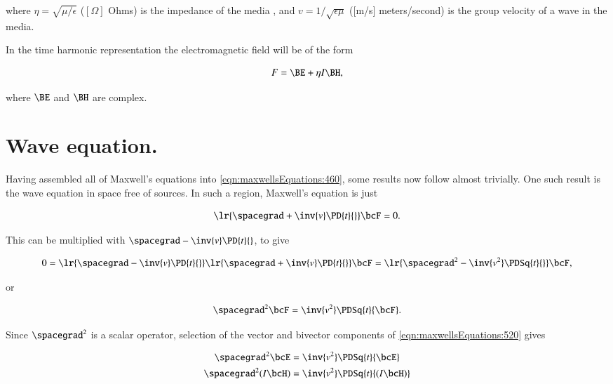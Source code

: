 where \( \eta = \sqrt{\mu/\epsilon} \) (\( [\Omega] \) Ohms)
is the impedance of the media
, and \( v = 1/\sqrt{\epsilon\mu} \)
([\si{m/s}] meters/second)
is the group velocity of a wave in the media.

In the time harmonic representation the electromagnetic field will be of the form

\begin{dmath}\label{eqn:maxwellsEquations:620}
F = \BE + \eta I \BH,
\end{dmath}

where \( \BE \) and \( \BH \) are complex.

\makedigression{

}

\section{Wave equation.}

Having assembled all of Maxwell's equations into \cref{eqn:maxwellsEquations:460}, some results now follow almost trivially.  One such result is the wave equation in space free of sources.  In such a region, Maxwell's equation is just

\begin{dmath}\label{eqn:maxwellsEquations:480}
\lr{ \spacegrad + \inv{v} \PD{t}{} } \bcF = 0.
\end{dmath}

This can be multiplied with \( \spacegrad - \inv{v} \PD{t}{} \), to give

\begin{dmath}\label{eqn:maxwellsEquations:500}
0 =
\lr{ \spacegrad - \inv{v} \PD{t}{} }
\lr{ \spacegrad + \inv{v} \PD{t}{} } \bcF
=
\lr{ \spacegrad^2 - \inv{v^2} \PDSq{t}{} } \bcF,
\end{dmath}

or

\begin{dmath}\label{eqn:maxwellsEquations:520}
\spacegrad^2 \bcF = \inv{v^2} \PDSq{t}{\bcF}.
\end{dmath}

Since \( \spacegrad^2 \) is a scalar operator, selection of the vector and bivector components of \cref{eqn:maxwellsEquations:520} gives

\begin{dmath}\label{eqn:maxwellsEquations:540}
\begin{aligned}
\spacegrad^2 \bcE &= \inv{v^2} \PDSq{t}{\bcE} \\
\spacegrad^2 (I \bcH) &= \inv{v^2} \PDSq{t}{(I \bcH)} \\
\end{aligned}
\end{dmath}

